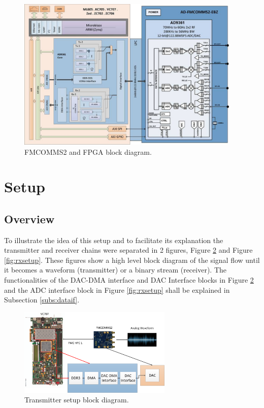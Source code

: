\begin{figure}[htbp]
    \centering
    \includegraphics[width=0.95\textwidth]{./figures/fmcomms2_bd}
    \caption{ FMCOMMS2 and FPGA block diagram.
    \label{fig:fmcommbd}}
\end{figure}


\section{Setup}
\label{impl:setup}

\subsection{Overview}

To illustrate the idea of this setup and to facilitate its explanation the
transmitter and receiver chains were separated in 2 figures, Figure
\ref{fig:txsetup} and Figure \ref{fig:rxsetup}. These figures show a high level
block diagram of the signal flow until it becomes a waveform (transmitter) or a
binary stream (receiver). The functionalities of the  DAC-DMA interface and DAC
Interface blocks in Figure \ref{fig:txsetup} and the ADC interface block in
Figure \ref{fig:rxsetup} shall be explained in Subsection \ref{subs:dataif}.

\begin{figure}[htbp]
    \centering
    \includegraphics[width=0.65\textwidth]{./figures/tx_setup}
    \caption{ Transmitter setup block diagram.
    \label{fig:txsetup}}
\end{figure}

